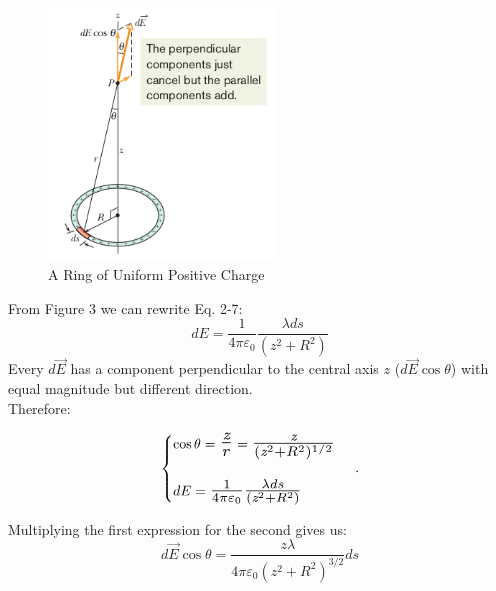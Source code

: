 \documentclass[12pt, a4paper]{article}
\begin{document}
		\begin{figure}
			\centering
			\includegraphics[width=6.07cm]{Physics2_PNGs/elec-line-charge.png}
			\caption{A Ring of Uniform Positive Charge}
			\label{fig:electric-line-of-charge}
		\end{figure}
		From Figure 3 we can rewrite Eq. 2-7: 
		\begin{equation*}
			dE = \frac{1}{4\pi\varepsilon_0} \frac{\lambda ds}{(\textit{z}^2 + R^2)}
				\tag{2-8}
		\end{equation*}
		Every $d\vec{E}$ has a component perpendicular to the central axis $\textit{z}$ ($d\vec{E}\cos\theta$) with equal magnitude but different direction. \\
		Therefore: 
		
		\begin{equation*}
			\begin{cases}
				\cos\theta = \scalebox{1.6}{$ \frac{\textit{z}}{r} $} = 
				\scalebox{1.4}{$ 
					\frac{\textit{z}}{(\textit{z}^2 + R^2)^{1/2}} $} \\ \\
				dE = \scalebox{1.3}{$\frac{1}{4\pi\varepsilon_0} \frac{\lambda ds}{(\textit{z}^2 + R^2)} $}
			\end{cases}\,.
		\end{equation*}
	
		Multiplying the first expression for the second gives us:
		\begin{equation*}
			d\vec{E}\cos\theta = \frac{\textit{z}\lambda}{4\pi\varepsilon_0(\textit{z}^2+R^2)^{3/2}}ds
			\tag{2-9}
		\end{equation*}
		
\end{document}
